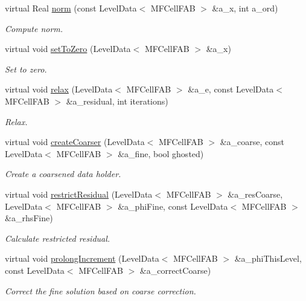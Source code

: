 \begin{DoxyCompactItemize}
virtual Real \hyperlink{classnwomfconductivityop_a33d396f8f08cd465c2582052d8c6d71b}{norm} (const Level\+Data$<$ M\+F\+Cell\+F\+AB $>$ \&a\+\_\+x, int a\+\_\+ord)
\begin{DoxyCompactList}\small\item\em Compute norm. \end{DoxyCompactList}\item 
virtual void \hyperlink{classnwomfconductivityop_a03b091425b126b996e60c142d1acbda8}{set\+To\+Zero} (Level\+Data$<$ M\+F\+Cell\+F\+AB $>$ \&a\+\_\+x)
\begin{DoxyCompactList}\small\item\em Set to zero. \end{DoxyCompactList}\item 
virtual void \hyperlink{classnwomfconductivityop_aaef6a1c69ff6baae34bfa9d6390c9152}{relax} (Level\+Data$<$ M\+F\+Cell\+F\+AB $>$ \&a\+\_\+e, const Level\+Data$<$ M\+F\+Cell\+F\+AB $>$ \&a\+\_\+residual, int iterations)
\begin{DoxyCompactList}\small\item\em Relax. \end{DoxyCompactList}\item 
virtual void \hyperlink{classnwomfconductivityop_af3f9e9e501a6eb143c02798b7c20872c}{create\+Coarser} (Level\+Data$<$ M\+F\+Cell\+F\+AB $>$ \&a\+\_\+coarse, const Level\+Data$<$ M\+F\+Cell\+F\+AB $>$ \&a\+\_\+fine, bool ghosted)
\begin{DoxyCompactList}\small\item\em Create a coarsened data holder. \end{DoxyCompactList}\item 
virtual void \hyperlink{classnwomfconductivityop_ae3a5f485606ead3895d75b925e506b99}{restrict\+Residual} (Level\+Data$<$ M\+F\+Cell\+F\+AB $>$ \&a\+\_\+res\+Coarse, Level\+Data$<$ M\+F\+Cell\+F\+AB $>$ \&a\+\_\+phi\+Fine, const Level\+Data$<$ M\+F\+Cell\+F\+AB $>$ \&a\+\_\+rhs\+Fine)
\begin{DoxyCompactList}\small\item\em Calculate restricted residual. \end{DoxyCompactList}\item 
virtual void \hyperlink{classnwomfconductivityop_ad4acd8f35f8ab8fe9c50c733f2b74dc4}{prolong\+Increment} (Level\+Data$<$ M\+F\+Cell\+F\+AB $>$ \&a\+\_\+phi\+This\+Level, const Level\+Data$<$ M\+F\+Cell\+F\+AB $>$ \&a\+\_\+correct\+Coarse)
\begin{DoxyCompactList}\small\item\em Correct the fine solution based on coarse correction. \end{DoxyCompactList}\item 

\end{DoxyCompactItemize}
